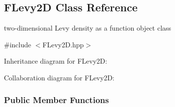 \hypertarget{classFLevy2D}{\subsection{\-F\-Levy2\-D \-Class \-Reference}
\label{classFLevy2D}
}


two-\/dimensional \-Levy density as a function object class  




{\ttfamily \#include $<$\-F\-Levy2\-D.\-hpp$>$}



\-Inheritance diagram for \-F\-Levy2\-D\-:


\-Collaboration diagram for \-F\-Levy2\-D\-:
\subsubsection*{\-Public \-Member \-Functions}
